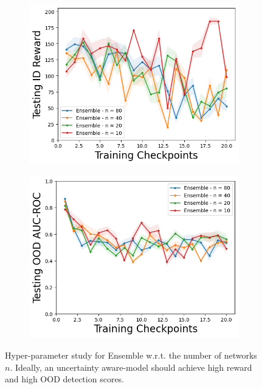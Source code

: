 \begin{figure}
\centering
    \begin{subfigure}{.45\textwidth}
        \includegraphics[width=\textwidth]{sections/011_icml2022/resources/CartPole-v0-mean_reward_-testing-hyperparameter-n_sample-ensemble.png}  
    \end{subfigure}
    \begin{subfigure}{.45\textwidth}
        \includegraphics[width=\textwidth]{sections/011_icml2022/resources/CartPoleOOD-v0-AUC-ROC-epistemic_-testing-hyperparameter-n_sample-ensemble.png}
    \end{subfigure}
        \vspace{-3mm}
    \caption{Hyper-parameter study for Ensemble w.r.t. the number of networks $n$. Ideally, an uncertainty aware-model should achieve high reward and high OOD detection scores.}
    \label{fig:hyperparameter-ensemble-cartpole}
    \vspace{-4mm}
\end{figure}